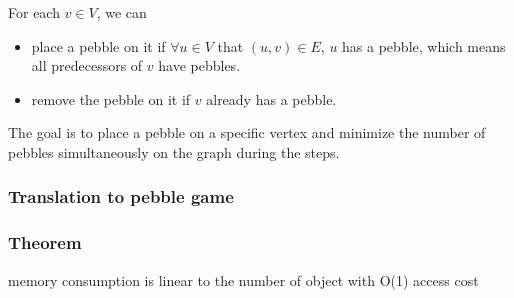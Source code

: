 For each $v\in V$, we can
\begin{itemize}
    \item place a pebble on it if $\forall u\in V$ that $(u, v)\in E$, $u$ has a pebble, which means all predecessors of $v$ have pebbles.
    \item remove the pebble on it if $v$ already has a pebble.
\end{itemize}

The goal is to place a pebble on a specific vertex and minimize the number of pebbles simultaneously on the graph during the steps.



\subsubsection{Translation to pebble game}
\subsubsection{Theorem}
memory consumption is linear to the number of object with O(1) access cost
